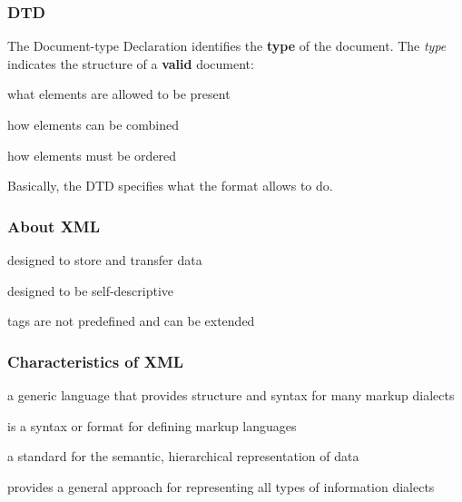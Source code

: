 \documentclass[12pt]{beamer}\usepackage[]{graphicx}\usepackage[]{color}
\begin{document}

\begin{frame}
\frametitle{DTD}

The Document-type Declaration identifies the \textbf{type} of the document. The \textit{type} indicates the structure of a \textbf{valid} document: 

\bi
 \item what elements are allowed to be present
 \item how elements can be combined
 \item how elements must be ordered
\ei
\eb

Basically, the DTD specifies what the format allows to do.
\end{frame}


\begin{frame}
\begin{center}
\Huge{}
\end{center}
\end{frame}


\begin{frame}
\frametitle{About XML}

\bi
 \item designed to store and transfer data
 \item designed to be self-descriptive
 \item tags are not predefined and can be extended
\ei
\eb

\end{frame}


\begin{frame}
\frametitle{Characteristics of XML}

\bi
 \item a generic language that provides structure and syntax for many markup dialects
 \item is a syntax or format for defining markup languages
 \item a standard for the semantic, hierarchical representation of data
 \item provides a general approach for representing all types of information  dialects
\ei
\eb

\end{frame}
\end{document}
